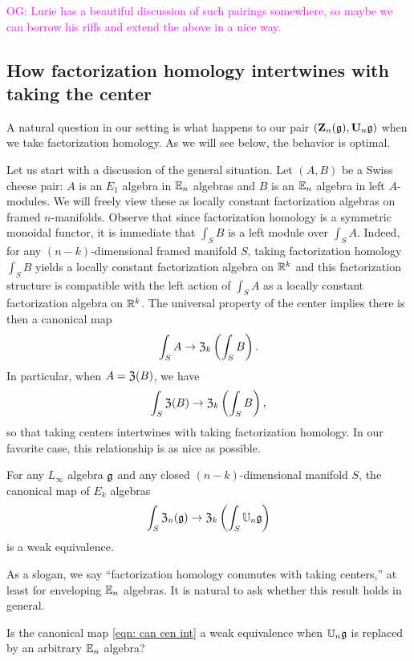 \documentclass[11pt]{amsart}
\numberwithin{equation}{section}
\def\owen{\textcolor{magenta}{OG: }\textcolor{magenta}}
\begin{document}
\owen{Lurie has a beautiful discussion of such pairings somewhere,
so maybe we can borrow his riffs and extend the above in a nice way.}

\subsection{How factorization homology intertwines with taking the center}

A natural question in our setting is what happens to our pair $(\mathbf Z_n(\mathfrak g), \mathbf U_n \mathfrak g)$ when we take factorization homology.
As we will see below, the behavior is optimal.

Let us start with a discussion of the general situation.
Let $(A,B)$ be a Swiss cheese pair: $A$ is an $E_1$ algebra in $\mathbb E_n$ algebras and $B$ is an $\mathbb E_n$ algebra in left $A$-modules. 
We will freely view these as locally constant factorization algebras on framed $n$-manifolds.
Observe that since factorization homology is a symmetric monoidal functor, 
it is immediate that $\int_S B$ is a left module over $\int_S A$.
Indeed, for any $(n-k)$-dimensional framed manifold $S$, 
taking factorization homology $\int_S B$ yields a locally constant factorization algebra on $\mathbb R^k$ 
and this factorization structure is compatible with the left action of $\int_S A$ as a locally constant factorization algebra on $\mathbb R^k$.
The universal property of the center implies there is then a canonical map
\[
\int_{S} A \to \mathfrak Z_k \left( \int_S B \right).
\]
In particular, when $A = \mathfrak Z(B)$, we have
\begin{equation}
\label{eqn: can cen int}
\int_{S} \mathfrak Z(B) \to \mathfrak Z_k \left( \int_S B \right),
\end{equation}
so that taking centers intertwines with taking factorization homology.
In our favorite case, this relationship is as nice as possible.

\begin{prp}
\label{prp: z commutes with int}
For any $L_\infty$ algebra $\mathfrak g$ and any closed $(n-k)$-dimensional manifold $S$,
the canonical map of $E_k$ algebras
\[
\int_{S} \mathfrak Z_n(\mathfrak g) \to \mathfrak Z_k \left( \int_S \mathbb U_n \mathfrak g \right)
\]
is a weak equivalence.
\end{prp}

As a slogan, we say ``factorization homology commutes with taking centers,'' 
at least for enveloping $\mathbb E_n$ algebras.
It is natural to ask whether this result holds in general.

\begin{qtn}
Is the canonical map \eqref{eqn: can cen int} a weak equivalence when $\mathbb U_n \mathfrak g$ is replaced by an arbitrary $\mathbb E_n$ algebra?
\end{qtn}
\end{document}
